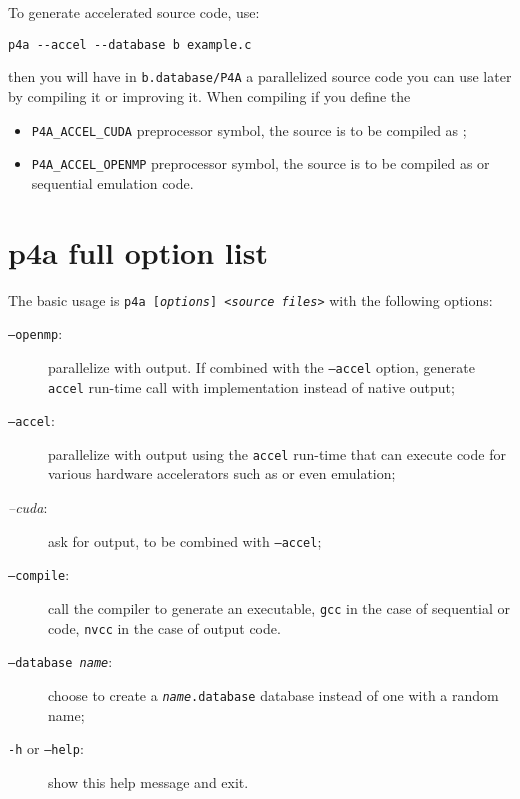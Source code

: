 \documentclass[a4paper]{article}
\begin{document}
To generate accelerated source code, use:
\begin{verbatim}
p4a --accel --database b example.c
\end{verbatim}
then you will have in \texttt{b.database/P4A} a parallelized source code
you can use later by compiling it or improving it. When compiling if you
define the
\begin{itemize}
\item \verb|P4A_ACCEL_CUDA| preprocessor symbol, the source is to be
  compiled as \Acuda;
\item \verb|P4A_ACCEL_OPENMP| preprocessor symbol, the source is to be
  compiled as \Aopenmp or sequential emulation code.
\end{itemize}


\section{p4a full option list}
\label{sec:options}

The basic usage is \texttt{p4a [\emph{options}] <\emph{source files}>}
with the following options:
\begin{description}
\item[\texttt{--openmp}:] parallelize with \Aopenmp output. If combined
  with the \texttt{--accel} option, generate \Apfa \texttt{accel} run-time
  call with \Aopenmp implementation instead of native \Aopenmp output;

\item[\texttt{--accel}:] parallelize with output using the \Apfa
  \texttt{accel} run-time that can execute code for various
  hardware accelerators such as \Agpu or even \Aopenmp emulation;

\item[\emph{--cuda}:] ask for \Acuda output, to be combined with
  \texttt{--accel};

\item[\texttt{--compile}:] call the compiler to generate an executable,
  \texttt{gcc} in the case of sequential or \Aopenmp code, \texttt{nvcc}
  in the case of \Acuda output code.

\item[\texttt{--database \emph{name}}:] choose to create a
  \texttt{\emph{name}.database} database instead of one with a random name;

\item[\texttt{-h} or \texttt{--help}:] show this help message and exit.
\end{description}



\end{document}
